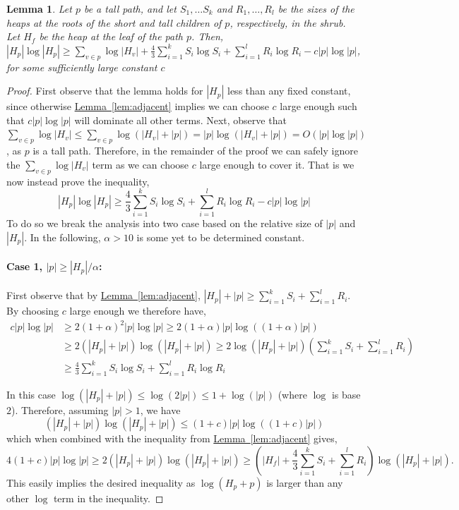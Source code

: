 \documentclass[11pt]{article}
\newtheorem{lemma}[theorem]{Lemma}
\theoremstyle{definition}
\newcommand{\Lem}[1]{\hyperref[lem:#1]{Lemma~\ref*{lem:#1}}} %
\newcommand{\pth}[2][\!]{#1\left({#2}\right)}
\begin{document}
\begin{lemma}
\label{lem:excess}
 Let $p$ be a tall path, and let $S_1, \dots S_k$ and $R_1, \dots, R_l$ be the sizes of the heaps at the roots of the short and tall children of $p$, respectively, in the shrub.  
 Let $H_f$ be the heap at the leaf of the path $p$.
 Then,  $|H_p| \log |H_p|   \geq  \sum_{v\in p} \log|H_v| + \frac{4}{3}\sum_{i=1}^k S_i \log S_i + \sum_{i=1}^l R_i \log R_i  -  c|p|\log |p|$, for some sufficiently large constant $c$
 \end{lemma}
\begin{proof}
 First observe that the lemma holds for $|H_p|$ less than any fixed constant, since otherwise \Lem{adjacent} implies we can choose $c$ 
 large enough such that $c|p|\log|p|$ will dominate all other terms.
 Next, observe that $\sum_{v\in p} \log|H_v| \leq \sum_{v\in p} \log(|H_v|+|p|) = |p|\log(|H_v|+|p|) = O(|p|\log|p|)$, as $p$ is a tall path.  
 Therefore, in the remainder of the proof  we can safely ignore the $\sum_{v\in p} \log|H_v|$ term as we can choose $c$ large enough to cover it.  
 That is we now instead prove the inequality,
 \[
  |H_p| \log |H_p|   \geq \frac{4}{3}\sum_{i=1}^k S_i \log S_i + \sum_{i=1}^l R_i \log R_i  -  c|p|\log |p|
 \]
 To do so we  break the analysis into two case based on the relative size of $|p|$ and $|H_p|$. 
 In the following, $\alpha>10$ is some yet to be determined constant.  

\paragraph{Case 1, $|p|\geq |H_p|/\alpha$:\\}
First observe that by \Lem{adjacent}, $|H_p|+|p| \geq \sum_{i=1}^k S_i+ \sum_{i=1}^l R_i$.
By choosing $c$ large enough we therefore have,
\begin{align*}
 c|p|\log|p| &\geq 2(1+\alpha)^2 |p|\log |p| \geq 2(1+\alpha)|p| \log((1+\alpha)|p|)\\
             &\geq 2(|H_p|+|p|)\log(|H_p|+|p|) \geq 2\log(|H_p|+|p|) \pth{\sum_{i=1}^k S_i + \sum_{i=1}^l R_i}\\
             &\geq \frac{4}{3}\sum_{i=1}^k S_i \log S_i + \sum_{i=1}^l R_i \log R_i 
\end{align*}



In this case $\log(|H_p|+|p|)\leq \log(2|p|) \leq 1+\log(|p|)$ (where $\log$ is base $2$).
Therefore, assuming $|p|>1$, we have 
\[
(|H_p|+|p|)\log(|H_p|+|p|)\leq (1+c)|p|\log((1+c)|p|) %
\]
which when combined with the inequality from \Lem{adjacent} gives, 
\[
 4(1+c)|p|\log |p| \geq 2(|H_p|+|p|)\log(|H_p|+|p|)\geq \pth{|H_f| + \frac{4}{3}\sum_{i=1}^k S_i + \sum_{i=1}^l R_i}\log(|H_p|+|p|).
\]
This easily implies the desired inequality as $\log(H_p+p)$ is larger than any other $\log$ term in the inequality.


\end{proof}
\end{document}
